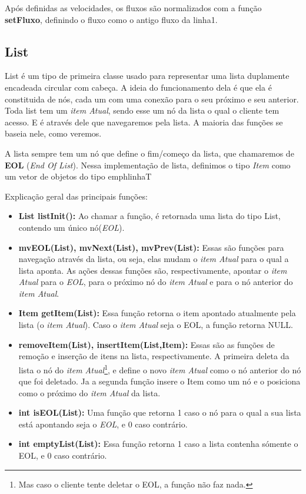 \documentclass[11pt]{article}
\begin{document}
Após definidas as velocidades, os fluxos são normalizados com a função \textbf{setFluxo}, definindo o fluxo como o antigo fluxo da linha1.

\subsection{List}

List é um tipo de primeira classe usado para representar uma lista duplamente encadeada circular com cabeça. A ideia do funcionamento dela é que ela é constituida de nós, cada um com uma conexão para o seu próximo e seu anterior. Toda list tem um \emph{item Atual}, sendo esse um nó da lista o qual o cliente tem acesso. E é através dele que navegaremos pela lista. A maioria das funções se baseia nele, como veremos.

	A lista sempre tem um nó que define o fim/começo da lista, que chamaremos de \textbf{EOL} (\emph{End Of List}). Nessa implementação de lista, definimos o tipo \emph{Item} como um vetor de objetos do tipo emph{linhaT}
	
	Explicação geral das principais funções:
	
\begin{itemize}
	\item \textbf{List listInit():} Ao chamar a função, é retornada uma lista do tipo List, contendo um único nó(\emph{EOL}).
	
	\item \textbf{mvEOL({\color{red}List}), mvNext({\color{red}List}), mvPrev({\color{red}List}):} Essas são funções para navegação através da lista, ou seja, elas mudam o \emph{item Atual} para o qual a lista aponta. As ações dessas funções são, respectivamente, apontar o \emph{item Atual} para o \emph{EOL}, para o próximo nó do \emph{item Atual} e para o nó anterior do \emph{item Atual}.
	
	\item \textbf{Item getItem({\color{red}List}):} Essa função retorna o item apontado atualmente pela lista (o \emph{item Atual}). Caso o \emph{item Atual} seja o EOL, a função retorna {\color{red}NULL}.
	
	\item \textbf{removeItem({\color{red}List}), insertItem({\color{red}List},{\color{red}Item}):} Essas são as funções de remoção e inserção de itens na lista, respectivamente. A primeira deleta da lista o nó do \emph{item Atual}\footnote{Mas caso o cliente tente deletar o EOL, a função não faz nada.}, e define o novo \emph{item Atual} como o nó anterior do nó que foi deletado. Ja a segunda função insere o Item como um nó e o posiciona como o próximo do \emph{item Atual} da lista.
	
	\item \textbf{int isEOL({\color{red}List}):} Uma função que retorna 1 caso o nó para o qual a sua lista está apontando seja o \emph{EOL}, e 0 caso contrário.
	
	\item \textbf{int emptyList({\color{red}List}):} Essa função retorna 1 caso a lista contenha sómente o EOL, e 0 caso contrário.
	
\end{itemize}
\end{document}
